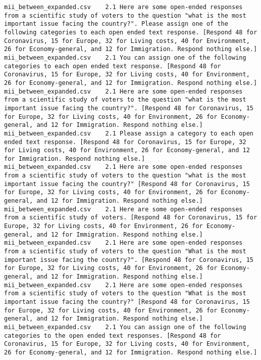 \begin{lstlisting}[label=lst:promptvariants]
mii_between_expanded.csv	2.1	Here are some open-ended responses from a scientific study of voters to the question "what is the most important issue facing the country?". Please assign one of the following categories to each open ended text response. [Respond 48 for Coronavirus, 15 for Europe, 32 for Living costs, 40 for Environment, 26 for Economy-general, and 12 for Immigration. Respond nothing else.]
mii_between_expanded.csv	2.1	You can assign one of the following categories to each open ended text response. [Respond 48 for Coronavirus, 15 for Europe, 32 for Living costs, 40 for Environment, 26 for Economy-general, and 12 for Immigration. Respond nothing else.]
mii_between_expanded.csv	2.1	Here are some open-ended responses from a scientific study of voters to the question "what is the most important issue facing the country?". [Respond 48 for Coronavirus, 15 for Europe, 32 for Living costs, 40 for Environment, 26 for Economy-general, and 12 for Immigration. Respond nothing else.]
mii_between_expanded.csv	2.1	Please assign a category to each open ended text response. [Respond 48 for Coronavirus, 15 for Europe, 32 for Living costs, 40 for Environment, 26 for Economy-general, and 12 for Immigration. Respond nothing else.]
mii_between_expanded.csv	2.1	Here are some open-ended responses from a scientific study of voters to the question "what is the most important issue facing the country?" [Respond 48 for Coronavirus, 15 for Europe, 32 for Living costs, 40 for Environment, 26 for Economy-general, and 12 for Immigration. Respond nothing else.]
mii_between_expanded.csv	2.1	Here are some open-ended responses from a scientific study of voters. [Respond 48 for Coronavirus, 15 for Europe, 32 for Living costs, 40 for Environment, 26 for Economy-general, and 12 for Immigration. Respond nothing else.]
mii_between_expanded.csv	2.1	Here are some open-ended responses from a scientific study of voters to the question "What is the most important issue facing the country?". [Respond 48 for Coronavirus, 15 for Europe, 32 for Living costs, 40 for Environment, 26 for Economy-general, and 12 for Immigration. Respond nothing else.]
mii_between_expanded.csv	2.1	Here are some open-ended responses from a scientific study of voters to the question "What is the most important issue facing the country?" [Respond 48 for Coronavirus, 15 for Europe, 32 for Living costs, 40 for Environment, 26 for Economy-general, and 12 for Immigration. Respond nothing else.]
mii_between_expanded.csv	2.1	You can assign one of the following categories to the open ended text responses. [Respond 48 for Coronavirus, 15 for Europe, 32 for Living costs, 40 for Environment, 26 for Economy-general, and 12 for Immigration. Respond nothing else.]

\end{lstlisting}
